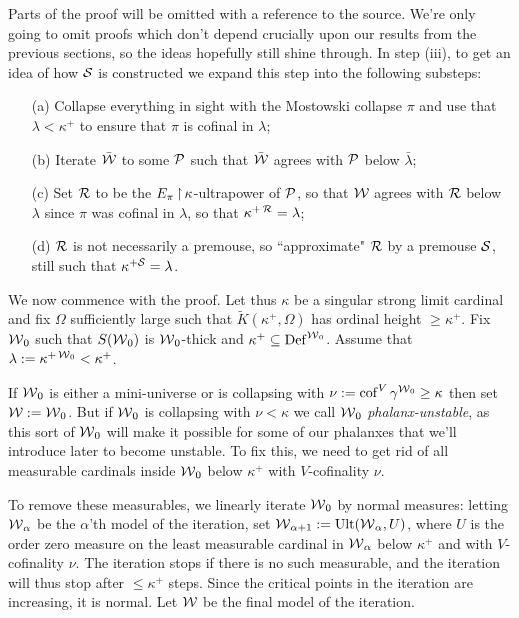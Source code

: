 Parts of the proof will be omitted with a reference to the source. We're only going to omit proofs which don't depend crucially upon our results from the previous sections, so the ideas hopefully still shine through. In step (iii), to get an idea of how $\S$ is constructed we expand this step into the following substeps:
\begin{enumerate}
\item[(a)] Collapse everything in sight with the Mostowski collapse $\pi$ and use that $\lambda<\kappa^+$ to ensure that $\pi$ is cofinal in $\lambda$;
\item[(b)] Iterate $\bar\W$ to some $\P$ such that $\bar\W$ agrees with $\P$ below $\bar\lambda$;
\item[(c)] Set $\R$ to be the $E_\pi\restr\kappa$-ultrapower of $\P$, so that $\W$ agrees with $\R$ below $\lambda$ since $\pi$ was cofinal in $\lambda$, so that $\kappa^{+\R}=\lambda$;
\item[(d)] $\R$ is not necessarily a premouse, so ``approximate" $\R$ by a premouse $\S$, still such that $\kappa^{+\S}=\lambda$.\\
\end{enumerate}

We now commence with the proof. Let thus $\kappa$ be a singular strong limit cardinal and fix $\Omega$ sufficiently large such that $\tilde K(\kappa^+,\Omega)$ has ordinal height $\geq\kappa^+$. Fix $\W_0$ such that $S(\W_0)$ is $\W_0$-thick and $\kappa^+\subset\Def^{\W_0}$. Assume that $\lambda:=\kappa^{+\W_0}<\kappa^+$.

\qquad If $\W_0$ is either a mini-universe or is collapsing with $\nu:=\cof^V\gamma^{\W_0}\geq\kappa$ then set $\W:=\W_0$. But if $\W_0$ is collapsing with $\nu<\kappa$ we call $\W_0$ \textit{phalanx-unstable}, as this sort of $\W_0$ will make it possible for some of our phalanxes that we'll introduce later to become unstable. To fix this, we need to get rid of all measurable cardinals inside $\W_0$ below $\kappa^+$ with $V$-cofinality $\nu$.

\qquad To remove these measurables, we linearly iterate $\W_0$ by normal measures: letting $\W_\alpha$ be the $\alpha$'th model of the iteration, set $\W_{\alpha+1}:=\ult(\W_\alpha,U)$, where $U$ is the order zero measure on the least measurable cardinal in $\W_\alpha$ below $\kappa^+$ and with $V$-cofinality $\nu$. The iteration stops if there is no such measurable, and the iteration will thus stop after $\leq\kappa^+$ steps. Since the critical points in the iteration are increasing, it is normal. Let $\W$ be the final model of the iteration.

